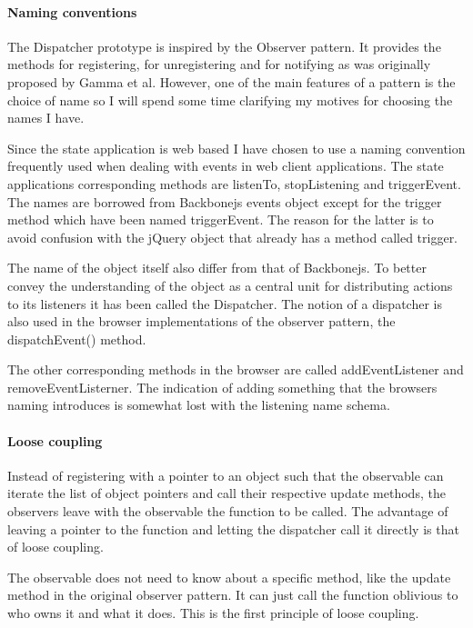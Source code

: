 \documentclass[english]{ifimaster}
\begin{document}
\paragraph{Naming conventions}
The Dispatcher prototype is inspired by the Observer pattern. It provides the methods for registering, for unregistering and for notifying as was originally proposed by Gamma et al. However, one of the main features of a pattern is the choice of name\parencite[p. 3]{gamma} so I will spend some time clarifying my motives for choosing the names I have. 

Since the state application is web based I have chosen to use a naming convention frequently used when dealing with events in web client applications. The state applications corresponding methods are listenTo, stopListening and triggerEvent. The names are borrowed from Backbonejs events object except for the trigger method which have been named triggerEvent. The reason for the latter is to avoid confusion with the jQuery object that already has a method called trigger.

The name of the object itself also differ from that of Backbonejs. To better convey the understanding of the object as a central unit for distributing actions to its listeners it has been called the Dispatcher. The notion of a dispatcher is also used in the browser implementations of the observer pattern, the dispatchEvent() method. 

The other corresponding methods in the browser are called addEventListener and removeEventListerner. The indication of adding something that the browsers naming introduces is somewhat lost with the listening name schema. 

\paragraph{Loose coupling} Instead of registering with a pointer to an object such that the observable can iterate the list of object pointers and call their respective update methods, the observers leave with the observable the function to be called. The advantage of leaving a pointer to the function and letting the dispatcher call it directly is that of loose coupling.

The observable does not need to know about a specific method, like the update method in the original observer pattern. It can just call the function oblivious to who owns it and what it does. This is the first principle of loose coupling.
\end{document}
